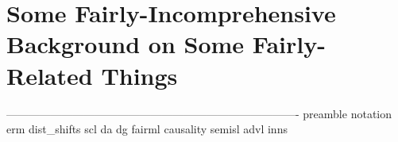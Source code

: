 \chapter{Some Fairly-Incomprehensive Background on Some Fairly-Related Things}\label{ch:background}
-------------------------------------------------------------------------------
{preamble}
{notation}
{erm}
{dist_shifts}
{scl}
{da}
{dg}
{fairml}
{causality}
{semisl}
{advl}
{inns}

